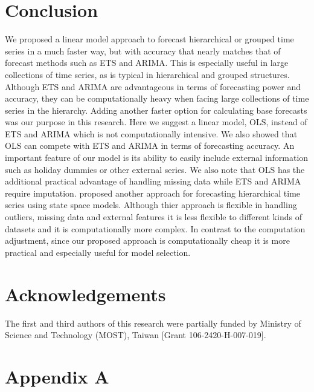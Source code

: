 \documentclass[11pt,a4paper,]{article}
\begin{document}
\hypertarget{conclusion}{%
\section{Conclusion}\label{conclusion}}

We proposed a linear model approach to forecast hierarchical or grouped
time series in a much faster way, but with accuracy that nearly matches
that of forecast methods such as ETS and ARIMA. This is especially
useful in large collections of time series, as is typical in
hierarchical and grouped structures. Although ETS and ARIMA are
advantageous in terms of forecasting power and accuracy, they can be
computationally heavy when facing large collections of time series in
the hierarchy. Adding another faster option for calculating base
forecasts was our purpose in this research. Here we suggest a linear
model, OLS, instead of ETS and ARIMA which is not computationally
intensive. We also showed that OLS can compete with ETS and ARIMA in
terms of forecasting accuracy. An important feature of our model is its
ability to easily include external information such as holiday dummies
or other external series. We also note that OLS has the additional
practical advantage of handling missing data while ETS and ARIMA require
imputation. \textcite{pennings2017} proposed another approach for
forecasting hierarchical time series using state space models. Although
thier approach is flexible in handling outliers, missing data and
external features it is less flexible to different kinds of datasets and
it is computationally more complex. In contrast to the computation
adjustment, since our proposed approach is computationally cheap it is
more practical and especially useful for model selection.

\hypertarget{acknowledgements}{%
\section*{Acknowledgements}\label{acknowledgements}}

The first and third authors of this research were partially funded by
Ministry of Science and Technology (MOST), Taiwan {[}Grant
106-2420-H-007-019{]}.

\clearpage

\clearpage

\hypertarget{appendixA}{%
\section*{Appendix A}\label{appendixA}}
\end{document}
